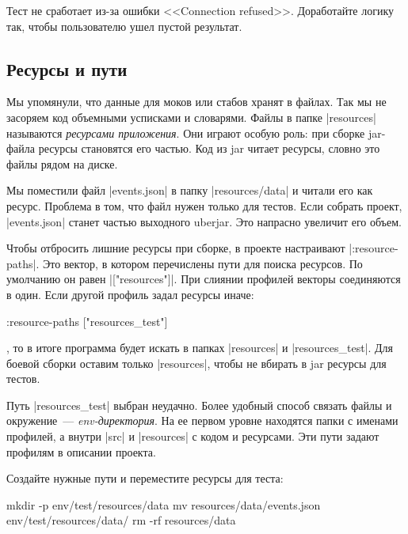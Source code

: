 Тест не сработает из-за ошибки <<Connection refused>>. Доработайте логику так,
чтобы пользователю ушел пустой результат.

\subsection{Ресурсы и пути}

Мы упомянули, что данные для моков или стабов хранят в файлах. Так мы не
засоряем код объемными усписками и словарями. Файлы в папке \spverb|resources|
называются \emph{ресурсами приложения}. Они играют особую роль: при сборке
jar-файла ресурсы становятся его частью. Код из jar читает ресурсы, словно это
файлы рядом на диске.

Мы поместили файл \spverb|events.json| в папку \spverb|resources/data| и читали
его как ресурс. Проблема в том, что файл нужен только для тестов. Если собрать
проект, \spverb|events.json| станет частью выходного uberjar. Это напрасно
увеличит его объем.

Чтобы отбросить лишние ресурсы при сборке, в проекте настраивают
\spverb|:resource-paths|. Это вектор, в котором перечислены пути для поиска
ресурсов. По умолчанию он равен \spverb|["resources"]|. При слиянии профилей
векторы соединяются в один. Если другой профиль задал ресурсы иначе:

\begin{english}
  \begin{clojure}
:resource-paths ["resources_test"]
  \end{clojure}
\end{english}

\noindent
, то в итоге программа будет искать в папках \spverb|resources| и
\spverb|resources_test|. Для боевой сборки оставим только \spverb|resources|,
чтобы не вбирать в jar ресурсы для тестов.

Путь \spverb|resources_test| выбран неудачно. Более удобный способ связать файлы
и окружение~--- \emph{env-директория}. На ее первом уровне находятся папки с
именами профилей, а внутри \spverb|src| и \spverb|resources| с кодом и
ресурсами. Эти пути задают профилям в описании проекта.

Создайте нужные пути и переместите ресурсы для теста:

\begin{english}
  \begin{bash}
mkdir -p env/test/resources/data
mv resources/data/events.json env/test/resources/data/
rm -rf resources/data
  \end{bash}
\end{english}

